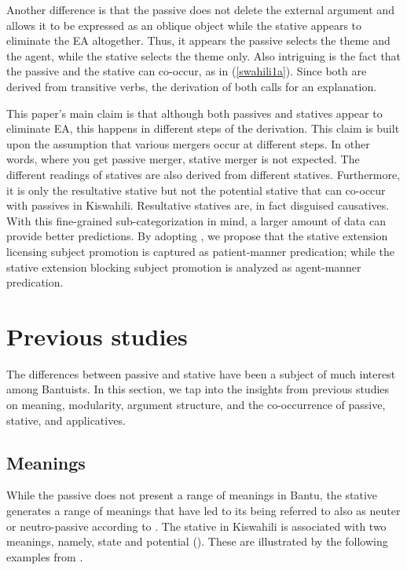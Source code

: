 \documentclass[output=paper]{langscibook}
\begin{document}
 Another difference is that the passive does not delete the external argument and allows it to be expressed as an oblique object while the stative appears to eliminate the EA altogether. Thus, it appears the passive selects the theme and the agent, while the stative selects the theme only. Also intriguing is the fact that the passive and the stative can co-occur, as in (\ref{swahili1a}). Since both are derived from transitive verbs, the derivation of both calls for an explanation. 

This paper's main claim is that although both passives and statives appear to eliminate EA, this happens in different steps of the derivation. This claim is built upon the assumption that various mergers occur at different steps. In other words, where you get passive merger, stative merger is not expected. The different readings of statives are also derived from different statives. Furthermore, it is only the resultative stative but not the potential stative that can co-occur with passives in Kiswahili. Resultative statives are, in fact disguised causatives. With this fine-grained sub-categorization in mind, a larger amount of data can provide better predictions. By adopting \citet{Hale:2002aa}, we propose that the stative extension licensing subject promotion is captured as patient-manner predication; while the stative extension blocking subject promotion is analyzed as agent-manner predication. 
 
\section{Previous studies}
The differences between passive and stative have been a subject of much interest among Bantuists. In this section, we tap into the insights from previous studies on meaning, modularity,  argument structure, and the co-occurrence of passive, stative, and applicatives. 

\subsection{Meanings}
While the passive does not present a range of meanings in Bantu, the stative generates a range of meanings that have led to its being referred to also as neuter or neutro-passive according to \citet[179]{8603069}. The stative in Kiswahili is associated with two meanings, namely, state and potential (\citet{Ashton-1947,Polome-nd,8603069}). These are illustrated by the following examples from \citet[227-228]{Ashton-1947}.
\end{document}
